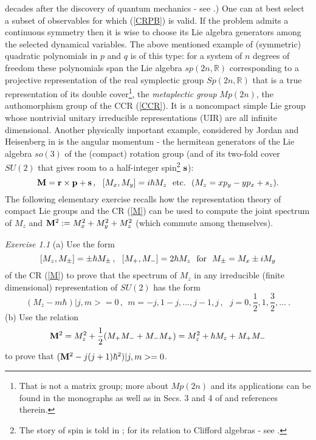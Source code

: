 \documentclass[12pt]{article}
\begin{document}
decades after the discovery of quantum mechanics - see \cite{G46, V51}.)
 One can at best select a subset of observables for which (\ref{CRPB}) is valid.
 If the problem admits a continuous symmetry then it is wise to choose its Lie
algebra generators among the selected dynamical variables. The above mentioned
example of (symmetric) quadratic polynomials in $p$ and $q$ is of this type:
for a system of $n$ degrees of freedom these polynomials span the Lie algebra
$sp(2n, \mathbb{R})$ corresponding to a projective representation of the real
symplectic group $Sp(2n, \mathbb{R})$ that is a true representation of its
double cover\footnote{That is not a matrix group; more about $Mp(2n)$ and its applications 
can be found in the monographs \cite{F, deG} as well as in Secs. 3 and 4 of 
\cite{T10} and references therein.}, the {\it metaplectic
group} $Mp(2n)$, the authomorphism group of the CCR (\ref{CCR}). It is a
noncompact simple Lie group whose nontrivial unitary irreducible representations
(UIR) are all infinite dimensional. Another physically important example,
considered by Jordan and Heisenberg in \cite{BHJ} is the angular momentum -
the hermitean generators of the Lie algebra $so(3)$ of the (compact) rotation
group (and of its two-fold cover $SU(2)$ that gives room to a half-integer spin\footnote{The story of spin 
is told in \cite{Tom}; for its relation to Clifford algebras - see \cite{T11}.} ${\bf s}$):
\begin{equation}
\label{M}
{\bf M} = {\bf r}\times {\bf p} + {\bf s} \,, \  \ [M_x, M_y] = i\hbar M_z \ \ {\rm etc.} \ \ (M_z = xp_y - yp_x +s_z).
\end{equation}
The following elementary exercise recalls how the representation theory of compact Lie groups
and the CR (\ref{M}) can be used to compute the joint spectrum of $M_z$ and ${\bf M}^2 :=
M_x^2 + M_y^2 + M_z^2$ (which commute among themselves).

{\it Exercise 1.1} (a) Use the form
\begin{equation}
\label{Mpm}
[M_z, M_{\pm}] = \pm \hbar M_{\pm}\,, \ \ [M_+, M_-] = 2\hbar M_z \ \ {\rm for} \ \ M_\pm = M_x \pm i M_y
\end{equation}
of the CR (\ref{M}) to prove that the spectrum of $M_z$ in any irreducible (finite dimensional) representation of
$SU(2)$ has the form
\begin{equation}
\label{Mz}
(M_z - m\hbar) |j, m> = 0\,, \ \ m = -j, 1-j, \dots ,j-1, j\,,\ \ \ j = 0, \frac{1}{2}, 1, \frac{3}{2}, \dots \ .
\end{equation}
(b) Use the relation
\begin{equation}
\label{M2}
{\bf M}^2 = M_z^2 +\frac{1}{2}(M_+ M_- + M_- M_+) = M_z^2 + \hbar M_z + M_+M_-
\end{equation}
to prove that $({\bf M}^2 - j(j+1)\hbar^2)|j, m> = 0$. 
\end{document}
